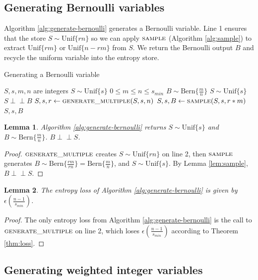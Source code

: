 \documentclass[12pt]{article}
\newtheorem{lemma}{Lemma}
\newcommand{\indep}{\perp\!\!\!\perp}
\newcommand{\unif}[1]{\mathrm{Unif}\{#1\}}
\newcommand{\bern}[1]{\mathrm{Bern}\{#1\}}
\begin{document}
\subsection{Generating Bernoulli variables}

Algorithm \ref{alg:generate-bernoulli} generates a Bernoulli variable. Line 1 ensures that the store $S \sim \unif{rn}$ so we can apply $\textsc{sample}$ (Algorithm \ref{alg:sample}) to extract $\unif{rm}$ or $\unif{n-rm}$ from $S$. We return the Bernoulli output $B$ and recycle the uniform variable into the entropy store.

\begin{algorithm}
\caption{Generating a Bernoulli variable}
\label{alg:generate-bernoulli}
\begin{algorithmic}[1]
\Require $S, s, m, n$ are integers
\Require $S \sim \unif{s}$
\Require $0 \le m \le n\le s_{min}$
\Ensure $B \sim \bern{\frac{m}{n}}$
\Ensure $S \sim \unif{s}$
\Ensure $S \indep B$
  \State $S, s, r \gets \textsc{generate\_multiple}(S, s, n)$
  \State $S, s, B \gets \textsc{sample}(S, s, r * m)$
  \State \Return $S, s, B$
\EndProcedure
\end{algorithmic}
\end{algorithm}

\begin{lemma}
Algorithm \ref{alg:generate-bernoulli} returns $S \sim \unif{s}$ and $B \sim \bern{\frac{m}{n}}$. $B \indep S$.
\end{lemma}

\begin{proof}
    $\textsc{generate\_multiple}$ creates $S \sim \unif{rn}$ on line 2, then $\textsc{sample}$ generates $B \sim \bern{\frac{rm}{rn}} = \bern{\frac{m}{n}}$, and $S \sim \unif{s}$. By Lemma \ref{lem:sample}, $B \indep S$.
\end{proof}

\begin{lemma}
The entropy loss of Algorithm \ref{alg:generate-bernoulli} is given by $\epsilon(\frac{n-1}{s_{min}})$.
\end{lemma}

\begin{proof}
    The only entropy loss from Algorithm \ref{alg:generate-bernoulli} is the call to $\textsc{generate\_multiple}$ on line 2, which loses $\epsilon(\frac{n-1}{s_{min}})$ according to Theorem \ref{thm:loss}.
\end{proof}

\subsection{Generating weighted integer variables}
\end{document}
